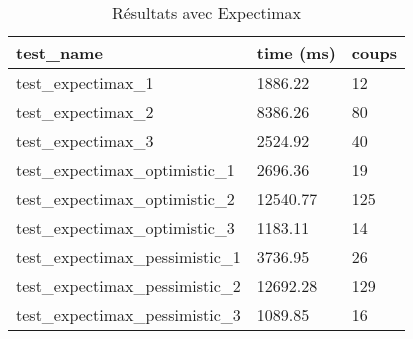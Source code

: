 \begin{table}[!ht]
    \centering
    \begin{tabular}{@{}lll@{}}
        test\_name & time (ms) & coups \\ \midrule
        test\_expectimax\_1 & 1886.22 & 12    \\
        test\_expectimax\_2 & 8386.26 & 80    \\
        test\_expectimax\_3 & 2524.92 & 40    \\
        test\_expectimax\_optimistic\_1 & 2696.36 & 19    \\
        test\_expectimax\_optimistic\_2 & 12540.77 & 125   \\
        test\_expectimax\_optimistic\_3 & 1183.11 & 14    \\
        test\_expectimax\_pessimistic\_1 & 3736.95 & 26    \\
        test\_expectimax\_pessimistic\_2 & 12692.28 & 129   \\
        test\_expectimax\_pessimistic\_3 & 1089.85 & 16 \\ \bottomrule
    \end{tabular}
    \caption{Résultats avec Expectimax}
\end{table}
